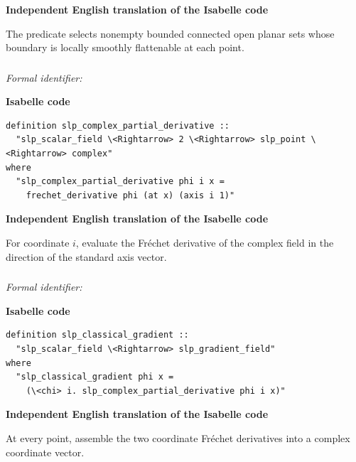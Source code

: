 \documentclass[10pt,oneside]{article}
\newcommand{\reviewlabel}[1]{\par\smallskip\noindent\textsf{\bfseries #1}\par\smallskip}
\begin{document}
\reviewlabel{Independent English translation of the Isabelle code}
The predicate selects nonempty bounded connected open planar sets whose boundary is locally smoothly flattenable at each point.

\subsubsection{\texttt{}}
\noindent\textit{Formal identifier:} \texttt{}

\reviewlabel{Isabelle code}
\begin{lstlisting}
definition slp_complex_partial_derivative ::
  "slp_scalar_field \<Rightarrow> 2 \<Rightarrow> slp_point \<Rightarrow> complex"
where
  "slp_complex_partial_derivative phi i x =
    frechet_derivative phi (at x) (axis i 1)"
\end{lstlisting}

\reviewlabel{Independent English translation of the Isabelle code}
For coordinate $i$, evaluate the Fréchet derivative of the complex field in the direction of the standard axis vector.

\subsubsection{\texttt{}}
\noindent\textit{Formal identifier:} \texttt{}

\reviewlabel{Isabelle code}
\begin{lstlisting}
definition slp_classical_gradient ::
  "slp_scalar_field \<Rightarrow> slp_gradient_field"
where
  "slp_classical_gradient phi x =
    (\<chi> i. slp_complex_partial_derivative phi i x)"
\end{lstlisting}

\reviewlabel{Independent English translation of the Isabelle code}
At every point, assemble the two coordinate Fréchet derivatives into a complex coordinate vector.
\end{document}
